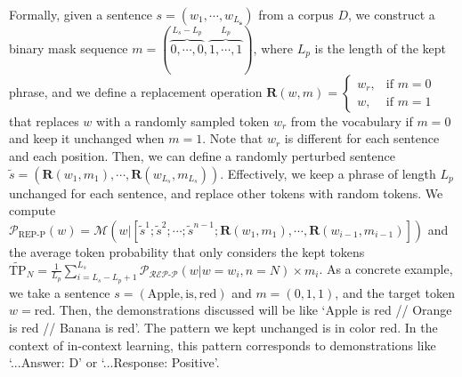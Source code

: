 \documentclass{article} %
\begin{document}
Formally, given a sentence $s=(w_{1}, \cdots, w_{L_{\mathbf{s}}})$ from a corpus $D$, we construct a binary mask sequence $m=(\overbrace{0,\cdots,0}^{L_s-L_p},\overbrace{1,\cdots,1}^{L_p})$, where $L_p$ is the length of the kept phrase, and we define a replacement operation $\mathbf{R}(w, m)=\begin{cases}
  w_r,& \text{if } m = 0\\
  w, & \text{if } m = 1
\end{cases}$ that replaces $w$ with a randomly sampled token $w_r$ from the vocabulary if $m=0$ and keep it unchanged when $m=1$. Note that $w_r$ is different for each sentence and each position. 
Then, we can define a randomly perturbed sentence $\tilde{s}=(\mathbf{R}(w_1, m_1), \cdots, \mathbf{R}(w_{L_s}, m_{L_s}))$. Effectively, we keep a phrase of length $L_p$ unchanged for each sentence, and replace other tokens with random tokens. 
We compute $\mathcal{P}_{\text{REP-P}}(w) = \mathcal{M}(w|[\tilde{s}^1;\tilde{s}^2;\cdots;\tilde{s}^{n-1};\mathbf{R}(w_{1},m_1),\cdots,\mathbf{R}(w_{i-1}, m_{i-1})])$
and the average token probability that only considers the kept tokens $\tilde{\text{TP}}_N=\frac{1}{L_p}\sum_{i=L_s-L_p+1}^{L_{s}}{\mathcal{P_{\text{REP-P}}}(w|w=w_i, n=N)} \times m_i$. 
As a concrete example, we take a sentence $s=(\text{Apple}, \text{is}, \text{red})$ and $m=(0, 1, 1)$, and the target token $w=\text{red}$. Then, the demonstrations discussed will be like `Apple {\color{red}is red} // Orange {\color{red}is red} // Banana {\color{red}is red}'. The pattern we kept unchanged is in color {\color{red}red}.
In the context of in-context learning, this pattern corresponds to demonstrations like `...{\color{red}Answer: D}' or `...{\color{red}Response: Positive}'.
\end{document}
